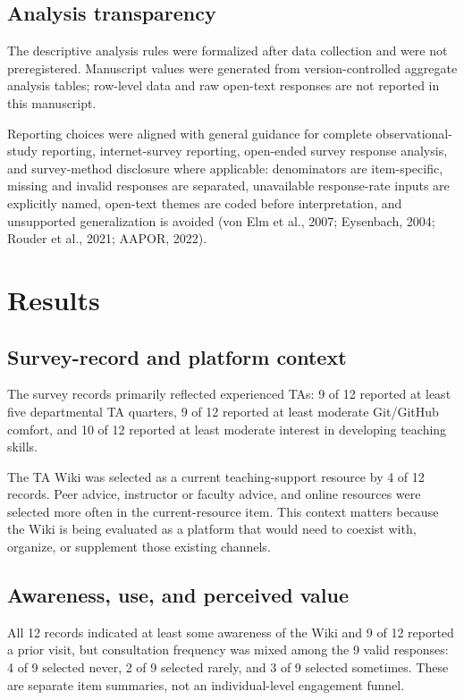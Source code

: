 \documentclass[11pt]{article}
\begin{document}
\subsection{Analysis transparency}
The descriptive analysis rules were formalized after data collection and were not preregistered. Manuscript values were generated from version-controlled aggregate analysis tables; row-level data and raw open-text responses are not reported in this manuscript.

Reporting choices were aligned with general guidance for complete observational-study reporting, internet-survey reporting, open-ended survey response analysis, and survey-method disclosure where applicable: denominators are item-specific, missing and invalid responses are separated, unavailable response-rate inputs are explicitly named, open-text themes are coded before interpretation, and unsupported generalization is avoided (von Elm et al., 2007; Eysenbach, 2004; Rouder et al., 2021; AAPOR, 2022).

\section{Results}
\subsection{Survey-record and platform context}
The survey records primarily reflected experienced TAs: 9 of 12 reported at least five departmental TA quarters, 9 of 12 reported at least moderate Git/GitHub comfort, and 10 of 12 reported at least moderate interest in developing teaching skills.

The TA Wiki was selected as a current teaching-support resource by 4 of 12 records. Peer advice, instructor or faculty advice, and online resources were selected more often in the current-resource item. This context matters because the Wiki is being evaluated as a platform that would need to coexist with, organize, or supplement those existing channels.

\subsection{Awareness, use, and perceived value}
All 12 records indicated at least some awareness of the Wiki and 9 of 12 reported a prior visit, but consultation frequency was mixed among the 9 valid responses: 4 of 9 selected never, 2 of 9 selected rarely, and 3 of 9 selected sometimes. These are separate item summaries, not an individual-level engagement funnel.
\end{document}
